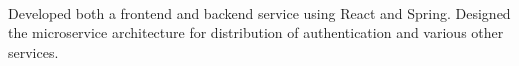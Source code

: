 \documentclass[]{cv}
\begin{document}
\begin{minipage}[t]{0.70\textwidth}
\\
\begin{tightemize}
\item Developed both a frontend and backend service using React and Spring. Designed the microservice architecture for distribution of authentication and various other services.
\end{tightemize}
\sectionsep


%
%

\end{minipage} 
\hfill
\end{document}
